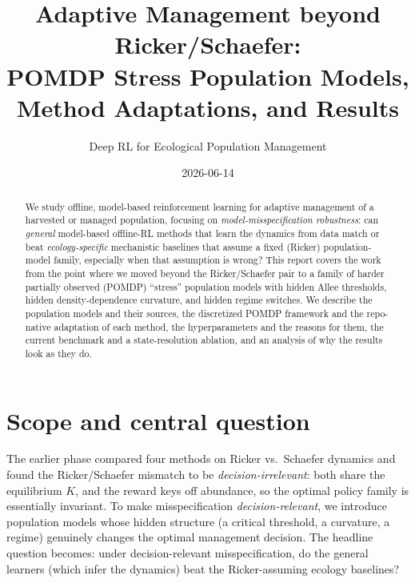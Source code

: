 \documentclass[11pt]{article}
\title{Adaptive Management beyond Ricker/Schaefer:\\
POMDP Stress Population Models, Method Adaptations, and Results}
\author{Deep RL for Ecological Population Management}
\date{2026-06-14}
\begin{document}
\maketitle

\begin{abstract}
We study offline, model-based reinforcement learning for adaptive management of a
harvested or managed population, focusing on \emph{model-misspecification robustness}:
can \emph{general} model-based offline-RL methods that learn the dynamics from data
match or beat \emph{ecology-specific} mechanistic baselines that assume a fixed (Ricker)
population-model family, especially when that assumption is wrong? This report covers
the work from the point where we moved beyond the Ricker/Schaefer pair to a family of
harder partially observed (POMDP) ``stress'' population models with hidden Allee
thresholds, hidden density-dependence curvature, and hidden regime switches. We describe
the population models and their sources, the discretized POMDP framework and the
repo-native adaptation of each method, the hyperparameters and the reasons for them, the
current benchmark and a state-resolution ablation, and an analysis of why the results
look as they do.
\end{abstract}

\section{Scope and central question}
The earlier phase compared four methods on Ricker vs.\ Schaefer dynamics and found the
Ricker/Schaefer mismatch to be \emph{decision-irrelevant}: both share the equilibrium
$K$, and the reward keys off abundance, so the optimal policy family is essentially
invariant. To make misspecification \emph{decision-relevant}, we introduce population
models whose hidden structure (a critical threshold, a curvature, a regime) genuinely
changes the optimal management decision. The headline question becomes: under
decision-relevant misspecification, do the general learners (which infer the dynamics)
beat the Ricker-assuming ecology baselines?
\end{document}
